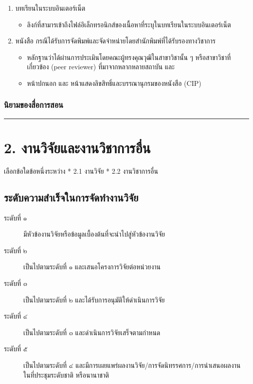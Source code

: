 \documentclass[a4paper,12pt,english]{sphinxmanual}
\begin{document}
\begin{enumerate}
%
\setcounter{enumi}{2}
\item {} 
บทเรียนในระบบอินเตอร์เน็ต
\begin{itemize}
\item {} 
ลิงก์ที่สามารเข้าถึงไฟล์อิเล็กทรอนิกส์ของเนื้อหาที่ระบุในบทเรียนในระบบอินเตอร์เน็ต

\end{itemize}

\item {} 
หนังสือ กรณีได้รับการจัดพิมพ์และจัดจำหน่ายโดยสำนักพิมพ์ที่ได้รับรองทางวิชาการ
\begin{itemize}
\item {} 
หลักฐานว่าได้ผ่านการประเมินโดยคณะผู้ทรงคุณวุฒิในสาขาวิชานั้น ๆ หรือสาขาวิชาที่เกี่ยวข้อง (peer reviewer) ที่มาจากหลากหลายสถาบัน และ

\item {} 
หน้าปกนอก และ หน้าแสดงลิขสิทธิ์และบรรณานุกรมของหนังสือ (CIP)

\end{itemize}

\end{enumerate}


\subsubsection{นิยามของสื่อการสอน}
\label{\detokenize{submission_part1:id6}}

\bigskip\hrule\bigskip



\section{2. งานวิจัยและงานวิชาการอื่น}
\label{\detokenize{submission_part1:id7}}
เลือกข้อใดข้อหนึ่งระหว่าง
* 2.1 งานวิจัย
* 2.2 งานวิชาการอื่น


\subsection{ระดับความสำเร็จในการจัดทำงานวิจัย}
\label{\detokenize{submission_part1:id8}}\begin{description}
\item[{ระดับที่ ๑}] \leavevmode
มีหัวข้องานวิจัยหรือข้อมูลเบื้องต้นที่จะนำไปสู่หัวข้องานวิจัย

\item[{ระดับที่ ๒}] \leavevmode
เป็นไปตามระดับที่ ๑ และเสนอโครงการวิจัยต่อหน่วยงาน

\item[{ระดับที่ ๓}] \leavevmode
เป็นไปตามระดับที่ ๒ และได้รับการอนุมัติให้ดำเนินการวิจัย

\item[{ระดับที่ ๔}] \leavevmode
เป็นไปตามระดับที่ ๓ และดำเนินการวิจัยเสร็จตามกำหนด

\item[{ระดับที่ ๕}] \leavevmode
เป็นไปตามระดับที่ ๔ และมีการเผยแพร่ผลงานวิจัย/การจัดนิทรรศการ/การนำเสนอผลงาน ในที่ประชุมระดับชาติ หรือนานาชาติ

\end{description}
\end{document}
